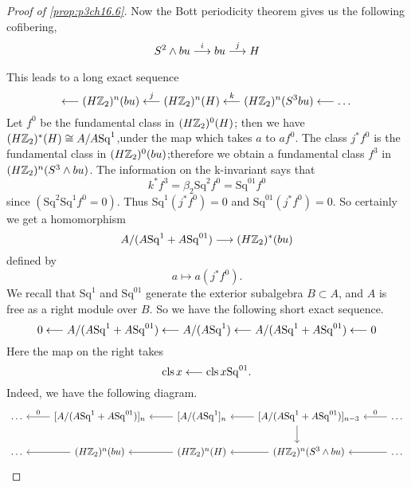 \documentclass[../main]{subfiles}
\begin{document}
\begin{proof}[Proof of \ref{prop:p3ch16.6}]
Now the Bott periodicity theorem gives us the following cofibering,$$
    S^{2} \wedge  bu \lar{i} bu \vra{j} H 
$$
This leads to a long exact sequence  $$
    \lal{} (H\bZ_2)^{n}(bu)\lal{j} (H\bZ_2)^{n}(H) \lal{k} (H\bZ_2)^{n}(S^{3}bu)\lal{} \dots %
    $$
    Let $f^{0}$ be the fundamental class in $(H\mathbb{Z}_2)^{0}(H)$; then we have $(H\mathbb{Z}_2)^{\ast}(H)\cong A/A\mathrm{Sq}^{1}$,under the map which takes $a$ to $af^{0}$. The class $j^{\ast}f^{0}$ is the fundamental class in $(H\mathbb{Z}_2)^{0}(bu)$;therefore we obtain a fundamental class $f^{3}$ in $(H\mathbb{Z}_2)^{n}(S^{3}\wedge bu)$. The information on the k-invariant
says that \begin{equation*}
    k^{\ast}f^{3}=\beta_{2}\mathrm{Sq}^{2}f^{0}=\mathrm{Sq}^{01}f^{0}
\end{equation*}
since $(\mathrm{Sq}^{2}\mathrm{Sq}^{1}f^{0}=0).$ Thus $\mathrm{Sq}^{1}(j^{\ast}f^{0})=0$ and $\mathrm{Sq}^{01}(j^{\ast}f^{0})=0$. So certainly we get a homomorphism \begin{equation*}
    A/(A\mathrm{Sq}^{1}+A\mathrm{Sq}^{01})\overset{}{\longrightarrow} (H\mathbb{Z}_2)^{\ast}(bu)
\end{equation*}
defined by \begin{equation*}
    a \mapsto a(j^{\ast}f^{0}).
\end{equation*}
We recall that $\mathrm{Sq}^{1}$ and $\mathrm{Sq}^{01}$ generate the exterior subalgebra  $B\subset A$, and $A$ is free as a right module over $B$. So we have the
following short exact sequence. \begin{equation*}
    0 \overset{}{\longleftarrow} A/(A\mathrm{Sq}^{1}+A\mathrm{Sq}^{01}) \overset{}{\longleftarrow} A/(A\mathrm{Sq}^{1}) \overset{}{\longleftarrow} A/(A\mathrm{Sq}^{1}+A\mathrm{Sq}^{01}) \overset{}{\longleftarrow} 0
\end{equation*}
Here the map on the right takes \begin{equation*}
    \te{cls} x \lal{} \te{cls} x\mathrm{Sq}^{01}. %
\end{equation*}
Indeed, we have the following diagram. 
\[\begin{tikzcd}
	\dots & {[A/(A\mathrm{Sq}^{1}+A\mathrm{Sq}^{01})]_{n}} & {[A/(A\mathrm{Sq}^{1}]_{n}} & {[A/(A\mathrm{Sq}^{1}+A\mathrm{Sq}^{01})]_{n-3}} & \dots \\
	\dots & {(H\bZ_2)^{n}(bu)} & {(H\bZ_2)^{n}(H)} & {(H\bZ_2)^{n}(S^{3}\wedge bu)} & \dots
	\arrow["0"', from=1-2, to=1-1]
	\arrow[from=1-3, to=1-2]
	\arrow[from=1-4, to=1-3]
	\arrow["0"', from=1-5, to=1-4]
	\arrow[from=2-2, to=2-1]
	\arrow[from=2-3, to=2-2]
	\arrow[from=2-4, to=2-3]
	\arrow[from=2-5, to=2-4]
	\arrow[shift right=5, from=1-4, to=2-4]

\end{tikzcd}\]
\end{proof}
\end{document}

